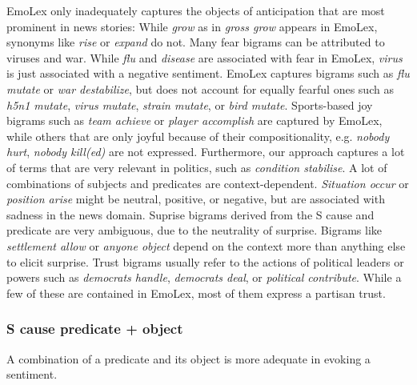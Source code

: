 EmoLex only inadequately captures the objects of anticipation that are most prominent in news stories: While \textit{grow} as in \textit{gross grow} appears in EmoLex, synonyms like \textit{rise} or \textit{expand} do not. Many fear bigrams can be attributed to viruses and war. While \textit{flu} and \textit{disease} are associated with fear in EmoLex, \textit{virus} is just associated with a negative sentiment. EmoLex captures bigrams such as \textit{flu mutate} or \textit{war destabilize}, but does not account for equally fearful ones such as \textit{h5n1 mutate}, \textit{virus mutate}, \textit{strain mutate}, or \textit{bird mutate}.
Sports-based joy bigrams such as \textit{team achieve} or \textit{player accomplish} are captured by EmoLex, while others that are only joyful because of their compositionality, e.g. \textit{nobody hurt}, \textit{nobody kill(ed)} are not expressed. Furthermore, our approach captures a lot of terms that are very relevant in politics, such as \textit{condition stabilise}.
A lot of combinations of subjects and predicates are context-dependent. \textit{Situation occur} or \textit{position arise} might be neutral, positive, or negative, but are associated with sadness in the news domain.
Suprise bigrams derived from the S cause and predicate are very ambiguous, due to the neutrality of surprise. Bigrams like \textit{settlement allow} or \textit{anyone object} depend on the context more than anything else to elicit surprise.
Trust bigrams usually refer to the actions of political leaders or powers such as \textit{democrats handle}, \textit{democrats deal}, or \textit{political contribute}. While a few of these are contained in EmoLex, most of them express a partisan trust.

\subsubsection{S cause predicate + object}

A combination of a predicate and its object is more adequate in evoking a sentiment. 

